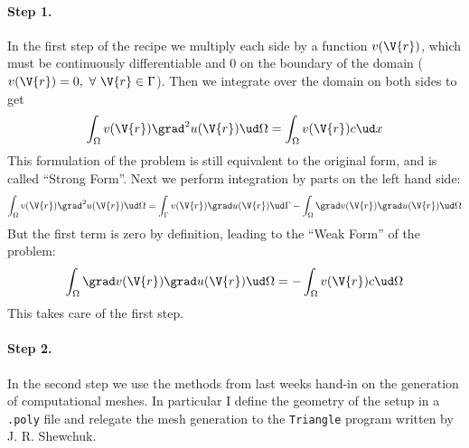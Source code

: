 \documentclass[sigconf]{acmart}
\begin{document}
\paragraph{Step 1.} In the first step of the recipe we multiply each side by a function $ v(\V{r}) $, which must be continuously differentiable and 0 on the boundary of the domain ($ v(\V{r})=0,\ \forall \ \V{r}\in \Gamma $). Then we integrate over the domain on both sides to get
\begin{equation}\label{key}
	\int_{\Omega} v(\V{r}) \grad^2 u(\V{r}) \ud \Omega = \int_{\Omega} v(\V{r}) c \ud x
\end{equation}
This formulation of the problem is still equivalent to the original form, and is called ``Strong Form''. Next we perform integration by parts on the left hand side:
\begin{equation}\label{key}
	\int_{\Omega} v(\V{r}) \grad^2 u(\V{r}) \ud \Omega = \int_{\Gamma} v(\V{r}) \grad u(\V{r}) \ud \Gamma - \int_{\Omega} \grad v(\V{r}) \grad u(\V{r}) \ud \Omega
\end{equation}
But the first term is zero by definition, leading to the ``Weak Form'' of the problem:
\begin{equation}\label{key}
\int_{\Omega} \grad v(\V{r}) \grad u(\V{r}) \ud \Omega =- \int_{\Omega} v(\V{r}) c \ud \Omega
\end{equation}
This takes care of the first step. 

\paragraph{Step 2.} In the second step we use the methods from last weeks hand-in on the generation of computational meshes. In particular I define the geometry of the setup in a \texttt{.poly} file and relegate the mesh generation to the \texttt{Triangle} program written by J. R. Shewchuk.
\end{document}
